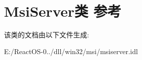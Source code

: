 \hypertarget{class_msi_server}{}\section{Msi\+Server类 参考}
\label{class_msi_server}


该类的文档由以下文件生成\+:\begin{DoxyCompactItemize}
\item 
E\+:/\+React\+O\+S-\/0../dll/win32/msi/msiserver.\+idl\end{DoxyCompactItemize}
